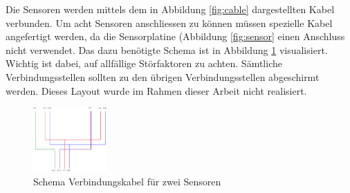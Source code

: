 Die Sensoren werden mittels dem in Abbildung \ref{fig:cable} dargestellten Kabel verbunden. Um acht Sensoren anschliessen zu können müssen spezielle Kabel angefertigt werden, da die Sensorplatine (Abbildung \ref{fig:sensor} einen Anschluss nicht verwendet. Das dazu benötigte Schema ist in Abbildung \ref{fig:schema_doppelsensor} visualisiert. Wichtig ist dabei, auf allfällige Störfaktoren zu achten. Sämtliche Verbindungsstellen sollten zu den übrigen Verbindungsstellen abgeschirmt werden. Dieses Layout wurde im Rahmen dieser Arbeit nicht realisiert.

\begin{figure}[H]%
\centering
\includegraphics[width=0.25\textwidth]{Images/Schema.png}
\caption{Schema Verbindungskabel für zwei Sensoren}
\label{fig:schema_doppelsensor}
\end{figure}

